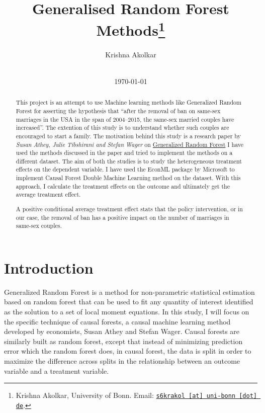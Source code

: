 \documentclass[11pt, a4paper, leqno]{article}
\begin{document}
\title{Generalised Random Forest Methods\thanks{Krishna Akolkar, University of Bonn. Email: \href{mailto:s6krakol@uni-bonn.de}{\nolinkurl{s6krakol [at] uni-bonn [dot] de}}.}}

\author{Krishna Akolkar}

\date{
    \\[1ex]
    \today
}

\maketitle


\begin{abstract}
    This project is an attempt to use Machine learning methods like Generalized Random Forest for asserting the hypothesis that
    ``after the removal of ban on same-sex marriages in the USA in the span of 2004--2015, the same-sex married couples have increased''.
    The extention of this study is to understand whether such couples are encouraged to start a family.
    The motivation behind this
    study is a research paper by \textit{Susan Athey, Julie Tibshirani and Stefan Wager} on \href{https://arxiv.org/pdf/1610.01271}{Generalized Random Forest}
    I have used the methods discussed in the paper and tried to implement the methods on a different dataset.
    The aim of both the studies is to study the heterogeneous treatment effects on the dependent variable.
    I have used the EconML package by Microsoft to implement Causal Forest Double Machine Learning method on the dataset.
    With this approach, I calculate the treatment effects on the outcome and ultimately get the average treatment effect.

    A positive conditional average treatment effect stats that the policy intervention, or in our case, the removal of ban has a positive
    impact on the number of marriages in same-sex couples.
\end{abstract}

\clearpage


\section{Introduction}\label{sec:introduction}

 Generalized Random Forest is a method for non-parametric statistical estimation based on random forest that can be used to fit any quantity
 of interest identified as the solution to a set of local moment equations.
 In this study, I will focus on the specific technique of causal forests, a causal machine learning method developed by economists, Susan Athey and Stefan Wager.
 Causal forests are similarly built as random forest, except that instead of minimizing prediction error which the random forest does, in causal forest, the data is split in order to
 maximize the difference across splits in the relationship between an outcome variable and a treatment variable.
\end{document}
